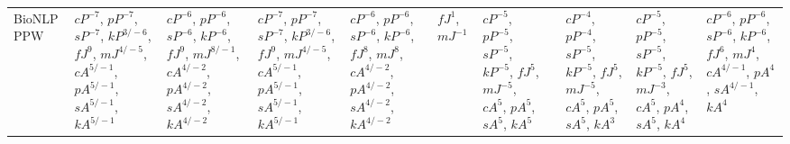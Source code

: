 \documentclass[letterpaper]{article} %
\begin{document}
\begin{sidewaystable*}
\begin{tabular}{l l l l l l l l l l l }
\multirow{10}{1.7cm}{BioNLP PPW} & \multirow{10}{1.7cm}{$cP^{-7}$, $pP^{-7}$, $sP^{-7}$, $kP^{3/-6}$, $fJ^{9}$, $mJ^{4/-5}$, $cA^{5/-1}$, $pA^{5/-1}$, $sA^{5/-1}$, $kA^{5/-1}$} & \multirow{10}{1.7cm}{$cP^{-6}$, $pP^{-6}$, $sP^{-6}$, $kP^{-6}$, $fJ^{9}$, $mJ^{8/-1}$, $cA^{4/-2}$, $pA^{4/-2}$, $sA^{4/-2}$, $kA^{4/-2}$} & \multirow{10}{1.7cm}{$cP^{-7}$, $pP^{-7}$, $sP^{-7}$, $kP^{3/-6}$, $fJ^{9}$, $mJ^{4/-5}$, $cA^{5/-1}$, $pA^{5/-1}$, $sA^{5/-1}$, $kA^{5/-1}$} & \multirow{10}{1.7cm}{$cP^{-6}$, $pP^{-6}$, $sP^{-6}$, $kP^{-6}$, $fJ^{8}$, $mJ^{8}$, $cA^{4/-2}$, $pA^{4/-2}$, $sA^{4/-2}$, $kA^{4/-2}$} & \multirow{10}{1.7cm}{$fJ^{1}$, $mJ^{-1}$} & \multirow{10}{1.7cm}{$cP^{-5}$, $pP^{-5}$, $sP^{-5}$, $kP^{-5}$, $fJ^{5}$, $mJ^{-5}$, $cA^{5}$, $pA^{5}$, $sA^{5}$, $kA^{5}$} & \multirow{10}{1.7cm}{} & \multirow{10}{1.7cm}{$cP^{-4}$, $pP^{-4}$, $sP^{-5}$, $kP^{-5}$, $fJ^{5}$, $mJ^{-5}$, $cA^{5}$, $pA^{5}$, $sA^{5}$, $kA^{3}$} & \multirow{10}{1.7cm}{$cP^{-5}$, $pP^{-5}$, $sP^{-5}$, $kP^{-5}$, $fJ^{5}$, $mJ^{-3}$, $cA^{5}$, $pA^{4}$, $sA^{5}$, $kA^{4}$} & \multirow{10}{1.7cm}{$cP^{-6}$, $pP^{-6}$, $sP^{-6}$, $kP^{-6}$, $fJ^{6}$, $mJ^{4}$, $cA^{4/-1}$, $pA^{4}$, $sA^{4/-1}$, $kA^{4}$} \\ \\ \\ \\ \\ \\ \\ \\ \\ \\


\end{tabular}
\end{sidewaystable*}
\end{document}
